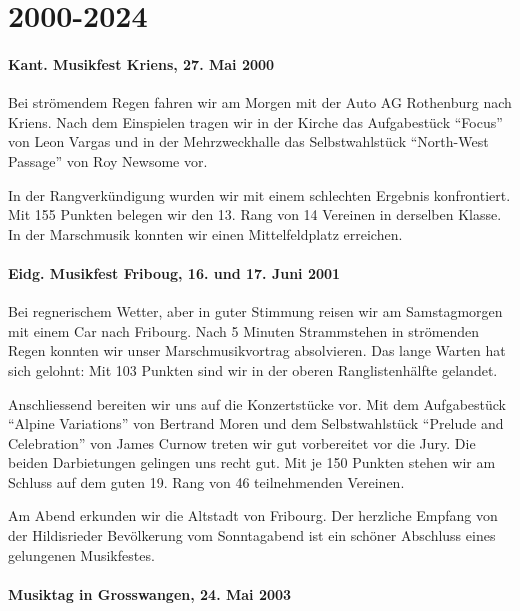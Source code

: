 \chapter{2000-2024}

\begin{history}

    \subsubsection*{Kant. Musikfest Kriens, 27. Mai 2000}

    Bei strömendem Regen fahren wir am Morgen mit der Auto AG Rothenburg nach
    Kriens. Nach dem Einspielen tragen wir in der Kirche das Aufgabestück
    \enquote{Focus} von Leon Vargas und in der Mehrzweckhalle das
    Selbstwahlstück \enquote{North-West Passage} von Roy Newsome vor.

    In der Rangverkündigung wurden wir mit einem schlechten Ergebnis
    konfrontiert. Mit 155 Punkten belegen wir den 13. Rang von 14 Vereinen in
    derselben Klasse. In der Marschmusik konnten wir einen Mittelfeldplatz
    erreichen.


    \subsubsection*{Eidg. Musikfest Friboug, 16. und 17. Juni 2001}

    Bei regnerischem Wetter, aber in guter Stimmung reisen wir am Samstagmorgen
    mit einem Car nach Fribourg. Nach 5 Minuten Strammstehen in strömenden Regen
    konnten wir unser Marschmusikvortrag absolvieren. Das lange Warten hat sich
    gelohnt: Mit 103 Punkten sind wir in der oberen Ranglistenhälfte gelandet.

    Anschliessend bereiten wir uns auf die Konzertstücke vor. Mit dem
    Aufgabestück \enquote{Alpine Variations} von Bertrand Moren und dem
    Selbstwahlstück \enquote{Prelude and Celebration} von James Curnow treten
    wir gut vorbereitet vor die Jury. Die beiden Darbietungen gelingen uns recht
    gut. Mit je 150 Punkten stehen wir am Schluss auf dem guten 19. Rang von 46
    teilnehmenden Vereinen.

    Am Abend erkunden wir die Altstadt von Fribourg. Der herzliche Empfang von
    der Hildisrieder Bevölkerung vom Sonntagabend ist ein schöner Abschluss
    eines gelungenen Musikfestes.


    \subsubsection*{Musiktag in Grosswangen, 24. Mai 2003}


\end{history}
